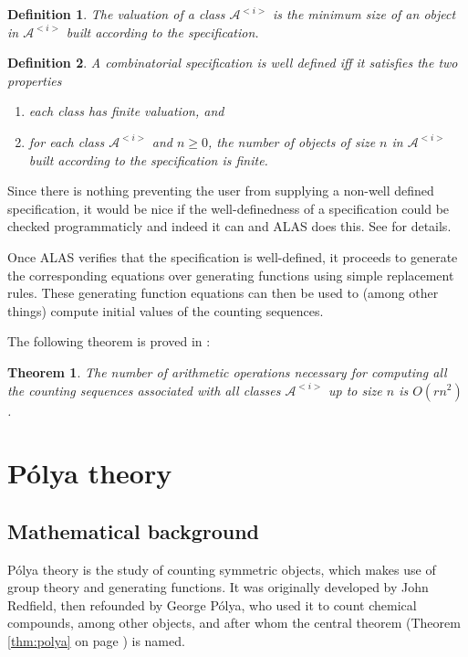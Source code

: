 \documentclass[12pt]{article}
\theoremstyle{plain}
\newtheorem{thm}{Theorem}
\newtheorem{defin}{Definition}
\begin{document}
\begin{defin}
The \emph{valuation} of a class \( \mathcal{A}^{<i>} \) is the minimum size of an object in \( \mathcal{A}^{<i>} \) built according to the specification.
\end{defin}

\begin{defin}
\label{defin:welldefined}
A combinatorial specification is \emph{well defined} iff it satisfies the two properties
\begin{enumerate}
\item each class has finite valuation, and
\item for each class \( \mathcal{A}^{<i>} \) and \( n \geq 0 \), the number of objects of size \(n\) in \( \mathcal{A}^{<i>} \) built according to the specification is finite.
\end{enumerate}
\end{defin}
Since there is nothing preventing the user from supplying a non-well defined specification,
it would be nice if the well-definedness of a specification could be checked programmaticly and indeed it can and ALAS does this. See \cite{assistant} for details.

Once ALAS verifies that the specification is well-defined, it proceeds to generate the corresponding equations over generating functions using simple replacement rules.
These generating function equations can then be used to (among other things) compute initial values of the counting sequences.

The following theorem is proved in \cite{assistant}:
\begin{thm}
The number of arithmetic operations necessary for computing all the counting sequences associated with all classes \( \mathcal{A}^{<i>} \) up to size \(n\) is \(O ( rn^2 ) \).
\end{thm}







\section{P\'olya theory}

\subsection{Mathematical background}

P\'olya theory is the study of counting symmetric objects, which makes use of group theory and generating functions.
It was originally developed by John Redfield, then refounded by George P\'olya, who used it to count chemical compounds, among other objects, and after whom the central theorem (Theorem \ref{thm:polya} on page \pageref{page:polyatheorem}) is named.
\end{document}
